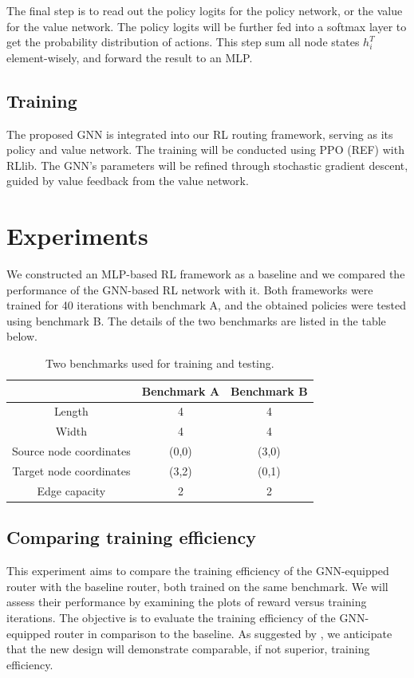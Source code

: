\documentclass[letterpaper]{article}
\begin{document}
The final step is to read out the policy logits for the policy network, or the value for the value network. The policy logits will be further fed into a softmax layer to get the probability distribution of actions. This step sum all node states $h_i^T$ element-wisely, and forward the result to an MLP.
\subsection{Training}
The proposed GNN is integrated into our RL routing framework, serving as its policy and value network. The training will be conducted using PPO (REF) with RLlib. The GNN's parameters will be refined through stochastic gradient descent, guided by value feedback from the value network.

    
\section{Experiments}
We constructed an MLP-based RL framework as a baseline and we compared the performance of the GNN-based RL network with it. Both frameworks were trained for 40 iterations with benchmark A, and the obtained policies were tested using benchmark B. The details of the two benchmarks are listed in the table below.

\begin{table}[h!]
    \caption{Two benchmarks used for training and testing.}
    \centering
    \begin{tabular}{|c c c|}
        \hline
        \hline
         & Benchmark A & Benchmark B \\
        \hline
        Length & 4 & 4 \\
        Width & 4 & 4 \\
        Source node coordinates & (0,0) & (3,0) \\
        Target node coordinates & (3,2) & (0,1) \\
        Edge capacity & 2 & 2 \\
        \hline
        \hline
    \end{tabular}
    \label{tab:benchmark}
    \end{table} 

\subsection{Comparing training efficiency}
This experiment aims to compare the training efficiency of the GNN-equipped router with the baseline router, both trained on the same benchmark. We will assess their performance by examining the plots of reward versus training iterations. The objective is to evaluate the training efficiency of the GNN-equipped router in comparison to the baseline. As suggested by \cite{Wang2018}, we anticipate that the new design will demonstrate comparable, if not superior, training efficiency.
\end{document}
